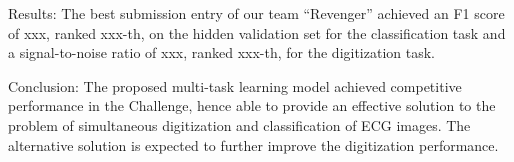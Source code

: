 \documentclass{cinc-abstract}
\newcommand\wordcount{ \currfilepath"}}
\begin{document}
Results: The best submission entry of our team ``Revenger'' achieved an F1 score of xxx, ranked xxx-th, on the hidden validation set for the classification task and a signal-to-noise ratio of xxx, ranked xxx-th, for the digitization task.

Conclusion: The proposed multi-task learning model achieved competitive performance in the Challenge, hence able to provide an effective solution to the problem of simultaneous digitization and classification of ECG images. The alternative solution is expected to further improve the digitization performance.


\end{document}
